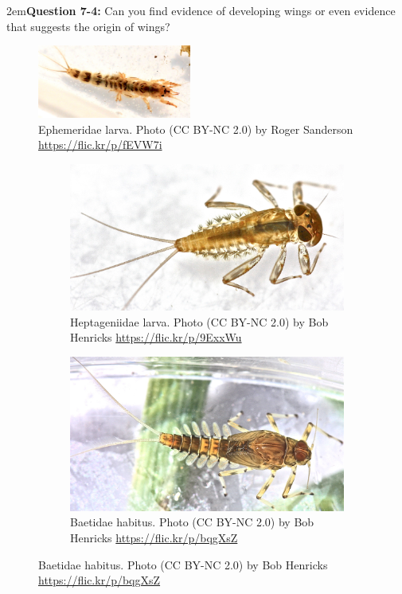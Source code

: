 \documentclass[letterpaper, 11pt]{article}
\begin{document}
\hangindent2em\textbf{Question 7-4:} Can you find evidence of developing wings or even evidence that suggests the origin of wings?\\

\begin{figure}[ht!]
  \centering
    \includegraphics[width=0.45\textwidth]{EphemeridLarva}
  \caption{Ephemeridae larva. Photo (CC BY-NC 2.0) by Roger Sanderson \url{https://flic.kr/p/fEVW7i}}
  \label{fig:ephemeridlarva}
\end{figure}

\begin{figure}[ht!]
    \centering
    \begin{subfigure}[ht!]{0.47\textwidth}
        \includegraphics[width=\textwidth]{HeptageniidLarva}
        \caption{Heptageniidae larva. Photo (CC BY-NC 2.0) by Bob Henricks \url{https://flic.kr/p/9ExxWu}}
        \label{fig:heptageniidlarva}
    \end{subfigure}
    \hfill
    \begin{subfigure}[ht!]{0.46\textwidth}
        \includegraphics[width=\textwidth]{BaetidLarva}
        \caption{Baetidae habitus. Photo (CC BY-NC 2.0) by Bob Henricks \url{https://flic.kr/p/bqgXsZ}}
        \label{fig:baetidlarva}
    \end{subfigure}
    \label{fig:mayflylarvae}
\end{figure}
\FloatBarrier
\end{document}
